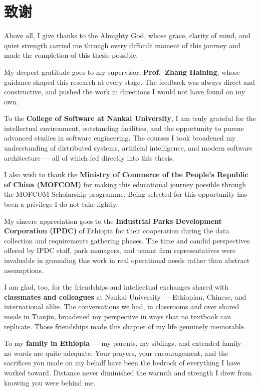 \chapter*{致谢}

Above all, I give thanks to the Almighty God, whose grace, clarity of mind, and quiet strength carried me through every difficult moment of this journey and made the completion of this thesis possible.

My deepest gratitude goes to my supervisor, \textbf{Prof.\ Zhang Haining}, whose guidance shaped this research at every stage. The feedback was always direct and constructive, and pushed the work in directions I would not have found on my own.

To the \textbf{College of Software at Nankai University}, I am truly grateful for the intellectual environment, outstanding facilities, and the opportunity to pursue advanced studies in software engineering. The courses I took broadened my understanding of distributed systems, artificial intelligence, and modern software architecture --- all of which fed directly into this thesis.

I also wish to thank the \textbf{Ministry of Commerce of the People's Republic of China (MOFCOM)} for making this educational journey possible through the MOFCOM Scholarship programme. Being selected for this opportunity has been a privilege I do not take lightly.

My sincere appreciation goes to the \textbf{Industrial Parks Development Corporation (IPDC)} of Ethiopia for their cooperation during the data collection and requirements gathering phases. The time and candid perspectives offered by IPDC staff, park managers, and tenant firm representatives were invaluable in grounding this work in real operational needs rather than abstract assumptions.

I am glad, too, for the friendships and intellectual exchanges shared with \textbf{classmates and colleagues} at Nankai University --- Ethiopian, Chinese, and international alike. The conversations we had, in classrooms and over shared meals in Tianjin, broadened my perspective in ways that no textbook can replicate. Those friendships made this chapter of my life genuinely memorable.

To my \textbf{family in Ethiopia} --- my parents, my siblings, and extended family --- no words are quite adequate. Your prayers, your encouragement, and the sacrifices you made on my behalf have been the bedrock of everything I have worked toward. Distance never diminished the warmth and strength I drew from knowing you were behind me.

